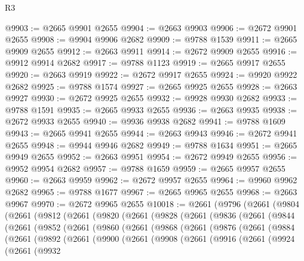 \begin{lexlean}{R3}
\begin{coremodule}
@9903 := @2665 @9901 @2655
@9904 := @2663 @9903
@9906 := @2672 @9901 @2655
@9908 := @9904 @9906 @2682
@9909 := @9788 @1539
@9911 := @2665 @9909 @2655
@9912 := @2663 @9911
@9914 := @2672 @9909 @2655
@9916 := @9912 @9914 @2682
@9917 := @9788 @1123
@9919 := @2665 @9917 @2655
@9920 := @2663 @9919
@9922 := @2672 @9917 @2655
@9924 := @9920 @9922 @2682
@9925 := @9788 @1574
@9927 := @2665 @9925 @2655
@9928 := @2663 @9927
@9930 := @2672 @9925 @2655
@9932 := @9928 @9930 @2682
@9933 := @9788 @1591
@9935 := @2665 @9933 @2655
@9936 := @2663 @9935
@9938 := @2672 @9933 @2655
@9940 := @9936 @9938 @2682
@9941 := @9788 @1609
@9943 := @2665 @9941 @2655
@9944 := @2663 @9943
@9946 := @2672 @9941 @2655
@9948 := @9944 @9946 @2682
@9949 := @9788 @1634
@9951 := @2665 @9949 @2655
@9952 := @2663 @9951
@9954 := @2672 @9949 @2655
@9956 := @9952 @9954 @2682
@9957 := @9788 @1659
@9959 := @2665 @9957 @2655
@9960 := @2663 @9959
@9962 := @2672 @9957 @2655
@9964 := @9960 @9962 @2682
@9965 := @9788 @1677
@9967 := @2665 @9965 @2655
@9968 := @2663 @9967
@9970 := @2672 @9965 @2655
@10018 := @2661
    (@9796
      (@2661
        (@9804
          (@2661
            (@9812
              (@2661
                (@9820
                  (@2661
                    (@9828
                      (@2661
                        (@9836
                          (@2661
                            (@9844
                              (@2661
                                (@9852
                                  (@2661
                                    (@9860
                                      (@2661
                                        (@9868
                                          (@2661
                                            (@9876
                                              (@2661
                                                (@9884
                                                  (@2661
                                                    (@9892
                                                      (@2661
                                                        (@9900
                                                          (@2661
                                                            (@9908
                                                              (@2661
                                                                (@9916
                                                                  (@2661
                                                                    (@9924
                                                                      (@2661
                                                                        (@9932

\end{coremodule}
\end{lexlean}
